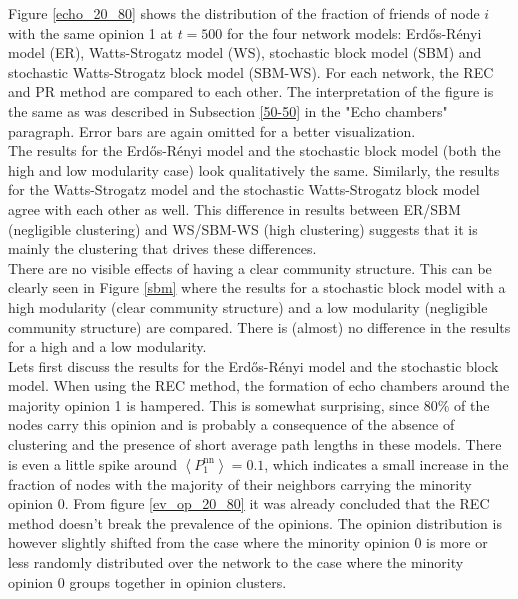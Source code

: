 \documentclass[11 pt , letterpaper , twoside , openright]{book}
\begin{document}
\newpage
\noindent
Figure \ref{echo_20_80} shows the distribution of the fraction of friends of node $i$ with the same opinion 1 at $t=500$ for the four network models: Erd\H{o}s-R\'{e}nyi model (ER), Watts-Strogatz model (WS), stochastic block model (SBM) and stochastic Watts-Strogatz block model (SBM-WS). For each network, the REC and PR method are compared to each other. The interpretation of the figure is the same as was described in Subsection \ref{50-50} in the "Echo chambers" paragraph. Error bars are again omitted for a better visualization.\\
\newline
The results for the Erd\H{o}s-R\'{e}nyi model and the stochastic block model (both the high and low modularity case) look qualitatively the same. Similarly, the results for the Watts-Strogatz model and the stochastic Watts-Strogatz block model agree with each other as well. This difference in results between ER/SBM (negligible clustering) and WS/SBM-WS (high clustering) suggests that it is mainly the clustering that drives these differences.\\
There are no visible effects of having a clear community structure. This can be clearly seen in Figure \ref{sbm} where the results for a stochastic block model with a high modularity (clear community structure) and a low modularity (negligible community structure) are compared. There is (almost) no difference in the results for a high and a low modularity.\\
\newline
Lets first discuss the results for the Erd\H{o}s-R\'{e}nyi model and the stochastic block model. When using the REC method, the formation of echo chambers around the majority opinion 1 is hampered. This is somewhat surprising, since $80\%$ of the nodes carry this opinion and is probably a consequence of the absence of clustering and the presence of short average path lengths in these models. There is even a little spike around $\left<P_1^{\text{nn}}\right> = 0.1$, which indicates a small increase in the fraction of nodes with the majority of their neighbors carrying the minority opinion 0. From figure \ref{ev_op_20_80} it was already concluded that the REC method doesn't break the prevalence of the opinions. The opinion distribution is however slightly shifted from the case where the minority opinion 0 is more or less randomly distributed over the network to the case where the minority opinion 0 groups together in opinion clusters. \\
\end{document}
